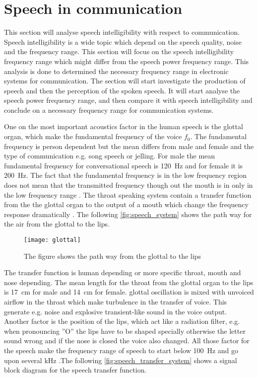 \section{Speech in communication}

This section will analyse speech intelligibility with respect to communication. Speech intelligibility is a wide topic which depend on the speech quality, noise and the frequency range. This section will focus on the speech intelligibility frequency range which might differ from the speech power frequency range. This analysis is done to determined the necessary frequency range in electronic systems for communication. The section will start investigate the production of speech and then the perception of the spoken speech. It will start analyse the speech power frequency range, and then compare it with speech intelligibility and conclude on a necessary frequency range for communication systems.

One on the most important acoustics factor in the human speech is the glottal organ, which make the fundamental frequency of the voice $f_0$. The fundamental frequency is person dependent but the mean differs from male and female and the type of communication e.g. song speech or jelling. For male the mean fundamental frequency for conversational speech is \SI{120}{\hertz} and for female it is \SI{200}{\hertz}. The fact that the fundamental frequency is in the low frequency region does not mean that the transmitted frequency though out the mouth is in only in the low frequency range . The throat speaking system contain a transfer function from the the glottal organ to the output of a mouth  which change the frequency response dramatically \citep{pulkki2015}. The following \autoref{fig:speech_system} shows the path way for the air from the glottal to the lips.

 \begin{figure}[H]
	\centering
		\texttt{[image: glottal]}
		\caption{The figure shows the path way from the glottal to the lips \citep{pulkki2015}}
		\label{fig:speech_system}
\end{figure}

The transfer function is human depending or more specific throat, mouth and nose depending. The mean length for the throat from the glottal organ to the lips is \SI{17}{\centi\meter} for male and \SI{14}{\centi\meter} for female. glottal oscillation is mixed with unvoiced airflow in the throat which make turbulence in the transfer of voice. This generate e.g. noise and explosive transient-like sound in the voice output. Another factor is the position of the lips, which act like a radiation filter, e.g. when pronouncing ''O'' the lips have to be shaped specially otherwise the letter sound wrong and if the nose is closed the voice also changed. All those factor for the speech make the frequency range of speech to start below \SI{100}{\hertz} and go upon several \si{\kilo\hertz} \citep{pulkki2015}.The following \autoref{fig:speech_transfer_system} shows a signal block diagram for the speech transfer function.

